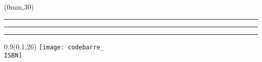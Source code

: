 \begingroup

\textblockorigin{0mm}{0mm}
\setlength{\parindent}{0mm}
\setlength{\parindent}{0mm}
\setlength{\banderougewidth}{2\TPHorizModule}
\setlength{\bandeorwidth}{\TPHorizModule}
\setlength{\gapwidth}{2pt}
\addtolength{\bandeorwidth}{-\gapwidth}

\begin{textblock*}{8.5in}(0mm,30\TPVertModule)
  \textcolor{or}{\rule{\bandeorwidth}{\TPVertModule}}%
  \rule{\gapwidth}{0pt}%
  \textcolor{rouge}{\rule{\banderougewidth}{\TPVertModule}}%
\end{textblock*}

\begin{textblock*}{0.9\TPHorizModule}(0.1\TPHorizModule,26\TPVertModule)
  \texttt{[image: codebarre\_\\ISBN]}
\end{textblock*}

\endgroup

